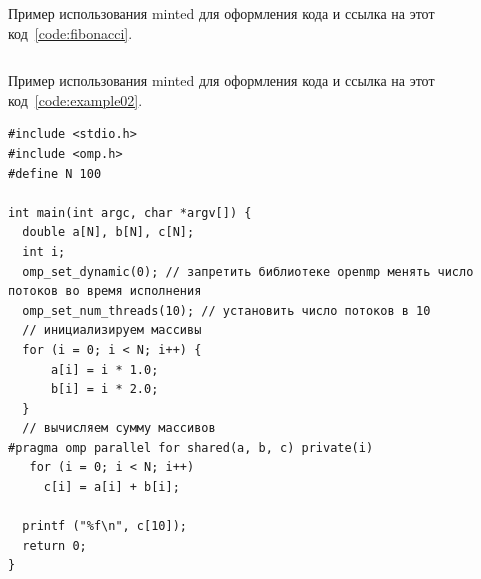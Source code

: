 Пример использования minted для оформления кода и ссылка на этот код~\ref{code:fibonacci}.
\begin{code}
\vspace{-\baselineskip}\inputminted{python}{src/fibonacci.py}
\end{code}

Пример использования minted для оформления кода и ссылка на этот код~\ref{code:example02}.
\begin{code}
\vspace{-\baselineskip}\begin{verbatim}
#include <stdio.h>
#include <omp.h>
#define N 100

int main(int argc, char *argv[]) {
  double a[N], b[N], c[N];
  int i;
  omp_set_dynamic(0); // запретить библиотеке openmp менять число потоков во время исполнения
  omp_set_num_threads(10); // установить число потоков в 10
  // инициализируем массивы
  for (i = 0; i < N; i++) {
      a[i] = i * 1.0;
      b[i] = i * 2.0;
  }
  // вычисляем сумму массивов
#pragma omp parallel for shared(a, b, c) private(i)
   for (i = 0; i < N; i++)
     c[i] = a[i] + b[i];

  printf ("%f\n", c[10]);
  return 0;
}
\end{verbatim}
\end{code}
